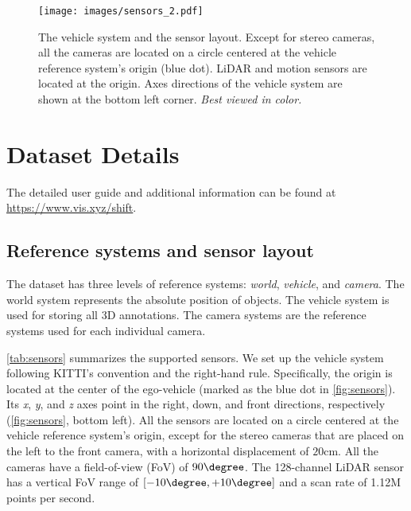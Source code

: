 \def\thesection{\Alph{section}}
\setcounter{section}{0}

\begin{figure}[b]
    \centering
    \texttt{[image: images/sensors\_2.pdf]}
    \caption{The vehicle system and the sensor layout. Except for stereo cameras, all the cameras are located on a circle centered at the vehicle reference system's origin (blue dot). LiDAR and motion sensors are located at the origin. Axes directions of the vehicle system are shown at the bottom left corner. \textit{Best viewed in color.}}
    \label{fig:sensors}
\end{figure}

\section{Dataset Details} \label{sec:dataset_details}
The detailed user guide and additional information can be found at \url{https://www.vis.xyz/shift}.

\subsection{Reference systems and sensor layout} \label{ssec:dataset_sensors}
The dataset has three levels of reference systems: \textit{world}, \textit{vehicle}, and \textit{camera}. The world system represents the absolute position of objects. The vehicle system is used for storing all 3D annotations. The camera systems are the reference systems used for each individual camera.

\autoref{tab:sensors} summarizes the supported sensors. We set up the vehicle system following KITTI's convention and the right-hand rule.
Specifically, the origin is located at the center of the ego-vehicle (marked as the blue dot in \autoref{fig:sensors}).
Its \textit{x}, \textit{y}, and \textit{z} axes point in the right, down, and front directions, respectively (\autoref{fig:sensors}, bottom left). 
All the sensors are located on a circle centered at the vehicle reference system's origin, except for the stereo cameras that are placed on the left to the front camera, with a horizontal displacement of $20 \mathrm{cm}$. 
All the cameras have a field-of-view (FoV) of $90\degree$.
The 128-channel LiDAR sensor has a vertical FoV range of $[-10\degree, +10\degree]$ and a scan rate of 1.12M points per second. 

